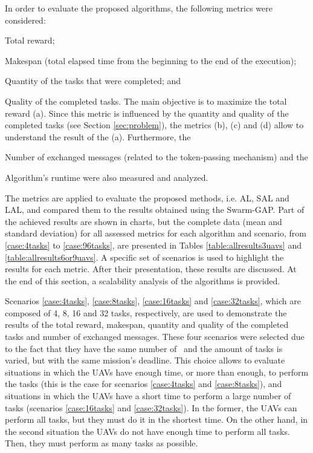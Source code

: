 In order to evaluate the proposed algorithms, the following metrics were considered:
\begin{inlinelist}
	\item Total reward;
	\item Makespan (total elapsed time from the beginning to the end of the execution);
	\item Quantity of the tasks that were completed; and
	\item Quality of the completed tasks. The main objective is to maximize the total reward (a). Since this metric is influenced by the quantity and quality of the completed tasks (see Section \ref{sec:problem}), the metrics (b), (c) and (d) allow to understand the result of the (a). Furthermore, the
	\item Number of exchanged messages (related to the token-passing mechanism) and the
	\item Algorithm's runtime were also measured and analyzed.
\end{inlinelist}
 
The metrics are applied to evaluate the proposed methods, i.e. AL, SAL and LAL, and compared them to the results obtained using the Swarm-GAP. Part of the achieved results are shown in charts, but the complete data (mean and standard deviation) for all assessed metrics for each algorithm and scenario, from \ref{case:4tasks} to \ref{case:96tasks}, are presented in Tables \ref{table:allresults3uavs} and \ref{table:allresults6or9uavs}. A specific set of scenarios is used to highlight the results for each metric. After their presentation, these results are discussed. At the end of this section, a scalability analysis of the algorithms is provided.



Scenarios \ref{case:4tasks}, \ref{case:8tasks}, \ref{case:16tasks} and \ref{case:32tasks}, which are composed of 4, 8, 16 and 32 tasks, respectively, are used to demonstrate the results of the total reward, makespan, quantity and quality of the completed tasks and number of exchanged messages. These four scenarios were selected due to the fact that they have the same number of \uavs\ and the amount of tasks is varied, but with the same mission's deadline. This choice allows to evaluate situations in which the UAVs have enough time, or more than enough, to perform the tasks (this is the case for scenarios \ref{case:4tasks} and \ref{case:8tasks}), and situations in which the UAVs have a short time to perform a large number of tasks (scenarios \ref{case:16tasks} and \ref{case:32tasks}).  In the former, the UAVs can perform all tasks, but they must do it in the shortest time. On the other hand, in the second situation the UAVs do not have enough time to perform all tasks. Then, they must perform as many tasks as possible.

